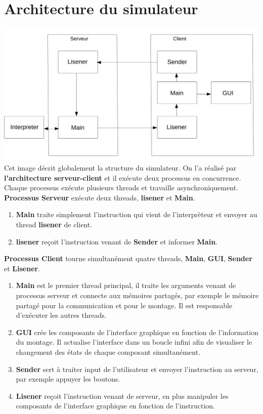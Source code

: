 \documentclass[14px]{article}
\begin{document}
\section{Architecture du simulateur}
\includegraphics[width=\textwidth]{simulator.png}\\[1cm]
Cet image décrit globalement la structure du simulateur. On l'a réalisé par \textbf{l'architecture serveur-client} et il exécute deux processus en concurrence. Chaque processus exécute plusieurs threads et travaille asynchroniquement.\\

\textbf{Processus Serveur} exécute deux threads, \textbf{lisener} et \textbf{Main}.
\begin{enumerate}
	\item \textbf{Main} traite simplement l'instruction qui vient de l'interprèteur et envoyer au thread \textbf{lisener} de client.
	\item \textbf{lisener} reçoit l'instruction venant de \textbf{Sender} et informer \textbf{Main}.
\end{enumerate}

\textbf{Processus Client} tourne simultanément quatre threads, \textbf{Main}, \textbf{GUI}, \textbf{Sender} et \textbf{Lisener}.
\begin{enumerate}
	\item \textbf{Main} est le premier thread principal, il traite les arguments venant de processus serveur et connecte aux mémoires partagés, par exemple le mémoire partagé pour la communication et pour le montage. Il est responsable d'exécuter les autres threads.
	\item \textbf{GUI} crée les composants de l'interface graphique en fonction de l'information du montage. Il actualise l'interface dans un boucle infini afin de visualiser le changement des états de chaque composant simultanément.
	\item \textbf{Sender} sert à traiter input de l'utilisateur et envoyer l'instruction au serveur, par exemple appuyer les boutons.
	\item \textbf{Lisener} reçoit l'instruction venant de serveur, en plus manipuler les composants de l'interface graphique en fonction de l'instruction.
\end{enumerate}
\end{document}
